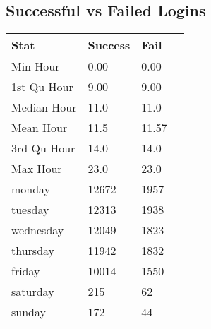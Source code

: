\documentclass[10pt]{article}
\begin{document}
\subsection*{Successful vs Failed Logins}
\begin{table}[h!]
  \begin{center}
    \scriptsize
    \begin{tabular}{llll}
      \toprule
      Stat & Success & Fail\\
      \midrule
      Min Hour & 0.00 & 0.00\\
      1st Qu Hour & 9.00 & 9.00\\
      Median Hour & 11.0 & 11.0\\
      Mean Hour & 11.5 & 11.57\\
      3rd Qu Hour & 14.0 & 14.0\\
      Max Hour & 23.0 & 23.0\\
      monday & 12672 & 1957\\
      tuesday & 12313 & 1938\\
      wednesday & 12049 & 1823\\
      thursday & 11942 & 1832\\
      friday & 10014 & 1550\\
      saturday & 215 & 62\\
      sunday & 172 & 44\\
      \bottomrule
    \end{tabular}
  \end{center}
\end{table}
\end{document}

